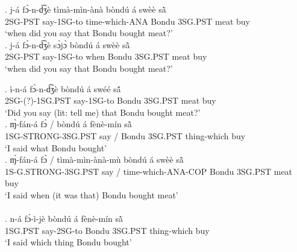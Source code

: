 \documentclass{assets/fieldnotes}
\begin{document}
\exg. j-á fɔ̀-n-d͡ʒè tìmà-mìn-ànà bòndú á swèè sã̀ \\
2SG-PST say-1SG-to time-which-ANA Bondu 3SG.PST meat buy\\
`when did you say that Bondu bought meat?' \\

\exg. j-á fɔ̀-n-d͡ʒè sɔ̀jɔ̀ bòndú á swèè sã̀ \\
2SG-PST say-1SG-to when Bondu 3SG.PST meat buy\\
`when did you say that Bondu bought meat?' \\



\exg. ì-n-á fɔ̀-n-d͡ʒè bòndú á swéé sã́ \\
2SG-(?)-1SG.PST say-1SG-to Bondu 3SG.PST meat buy\\
`Did you say (lit: tell me) that Bondu bought meat?' \\

\exg. ɱ̀-fán-á fɔ̀ / bòndú á fènè-mín sã̀ \\
1SG-STRONG-3SG.PST  say / Bondu 3SG.PST thing-which buy\\
`I said what Bondu bought' \\

\exg. ɱ̀-fán-á fɔ̀ / tìmà-mìn-ànà-mù bòndú á swèè sã̀ \\
1S-G.STRONG-3SG.PST say / time-which-ANA-COP Bondu 3SG.PST meat buy\\
`I said when (it was that) Bondu bought meat' \\

\\

\exg. n-á fɔ̀-ì-jè bòndú á fènè-mín sã̀ \\
1SG.PST say-2SG-to Bondu 3SG.PST thing-which buy\\
`I said which thing Bondu bought' \\
\end{document}
